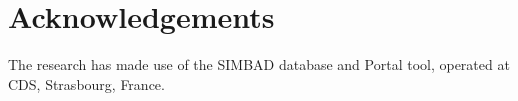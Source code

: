 \chapter*{Acknowledgements}

The research has made use of the SIMBAD database and Portal tool, operated at CDS, Strasbourg, France. 
